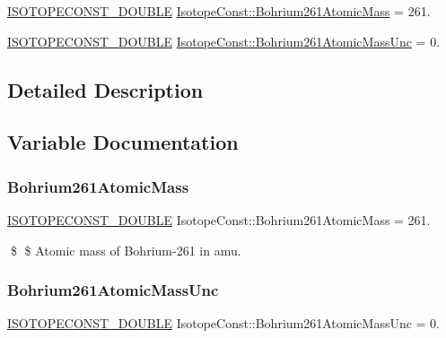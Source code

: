 \begin{DoxyCompactItemize}
\item 
\mbox{\hyperlink{group___isotope_const-_macros_ga8f45a7272ce02c0b4c65c44636ed719a}{I\+S\+O\+T\+O\+P\+E\+C\+O\+N\+S\+T\+\_\+\+D\+O\+U\+B\+LE}} \mbox{\hyperlink{group___isotope_const-_bohrium-_bh261_ga55679b4579d5d58e90a0967bc71dbd6b}{Isotope\+Const\+::\+Bohrium261\+Atomic\+Mass}} = 261.
\item 
\mbox{\hyperlink{group___isotope_const-_macros_ga8f45a7272ce02c0b4c65c44636ed719a}{I\+S\+O\+T\+O\+P\+E\+C\+O\+N\+S\+T\+\_\+\+D\+O\+U\+B\+LE}} \mbox{\hyperlink{group___isotope_const-_bohrium-_bh261_ga88dfce1bcda8ff06eed75d67eb4f9279}{Isotope\+Const\+::\+Bohrium261\+Atomic\+Mass\+Unc}} = 0.
\end{DoxyCompactItemize}


\subsection{Detailed Description}


\subsection{Variable Documentation}
\mbox{\label{group___isotope_const-_bohrium-_bh261_ga55679b4579d5d58e90a0967bc71dbd6b}} 
\subsubsection{\texorpdfstring{Bohrium261\+Atomic\+Mass}{Bohrium261AtomicMass}}
{\footnotesize\ttfamily \mbox{\hyperlink{group___isotope_const-_macros_ga8f45a7272ce02c0b4c65c44636ed719a}{I\+S\+O\+T\+O\+P\+E\+C\+O\+N\+S\+T\+\_\+\+D\+O\+U\+B\+LE}} Isotope\+Const\+::\+Bohrium261\+Atomic\+Mass = 261.}

\$ \$ Atomic mass of Bohrium-\/261 in amu. \mbox{\label{group___isotope_const-_bohrium-_bh261_ga88dfce1bcda8ff06eed75d67eb4f9279}} 
\subsubsection{\texorpdfstring{Bohrium261\+Atomic\+Mass\+Unc}{Bohrium261AtomicMassUnc}}
{\footnotesize\ttfamily \mbox{\hyperlink{group___isotope_const-_macros_ga8f45a7272ce02c0b4c65c44636ed719a}{I\+S\+O\+T\+O\+P\+E\+C\+O\+N\+S\+T\+\_\+\+D\+O\+U\+B\+LE}} Isotope\+Const\+::\+Bohrium261\+Atomic\+Mass\+Unc = 0.}


